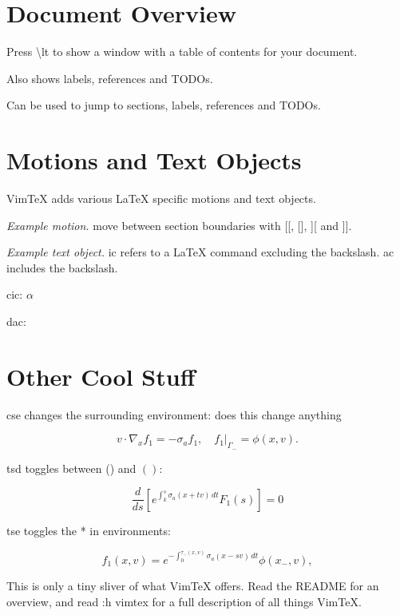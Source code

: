 \documentclass{article}
\newcommand{\lt}{\textbackslash{}lt }
\begin{document}
\section{Document Overview}

Press \lt to show a window with a table of contents for your document.

Also shows labels, references and TODOs. 

Can be used to jump to sections, labels, references and TODOs.















\section{Motions and Text Objects}

VimTeX adds various LaTeX specific motions and text objects.

\emph{Example motion.} move between section boundaries with [[, [], ][ and ]].

\emph{Example text object.} ic refers to a LaTeX command excluding the
backslash. ac includes the backslash.

cic: \( \alpha \)

dac: \(  \)











\section{Other Cool Stuff}

cse changes the surrounding environment:
does this change anything

\begin{equation}
  v \cdot \nabla_x f_1 = -\sigma_a f_1, \quad f_1 \rvert_{\Gamma_-} = \phi(x,v).
\end{equation}

tsd toggles between () and \( \left( \right) \):

\begin{equation*}
  \frac{d}{ds} \left[ e^{\int_k^s \sigma_a(x + tv)\,dt} F_1(s) \right] = 0
\end{equation*}

tse toggles the * in environments:

\begin{equation}
  f_1(x, v) = e^{-\int_0^{\tau_-(x, v)} \sigma_a(x - sv)\,dt} \phi(x_-, v),
\end{equation}

This is only a tiny sliver of what VimTeX offers.
Read the README for an overview, and read :h vimtex for a full description of
all things VimTeX.
\end{document}
